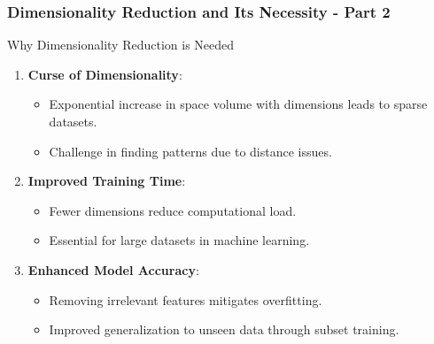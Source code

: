 \documentclass[aspectratio=169]{beamer}
\begin{document}
\begin{frame}[fragile]
    \frametitle{Dimensionality Reduction and Its Necessity - Part 2}
    \begin{block}{Why Dimensionality Reduction is Needed}
        \begin{enumerate}
            \item \textbf{Curse of Dimensionality}:
                \begin{itemize}
                    \item Exponential increase in space volume with dimensions leads to sparse datasets.
                    \item Challenge in finding patterns due to distance issues.
                \end{itemize}
            \item \textbf{Improved Training Time}:
                \begin{itemize}
                    \item Fewer dimensions reduce computational load.
                    \item Essential for large datasets in machine learning.
                \end{itemize}
            \item \textbf{Enhanced Model Accuracy}:
                \begin{itemize}
                    \item Removing irrelevant features mitigates overfitting.
                    \item Improved generalization to unseen data through subset training.
                \end{itemize}
        \end{enumerate}
    \end{block}
\end{frame}
\end{document}
